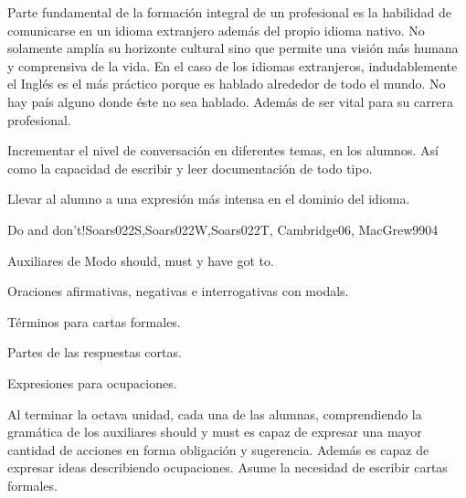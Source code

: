 \begin{syllabus}


\begin{justification}
Parte fundamental de la formación integral de un profesional es la habilidad 
de comunicarse en un idioma extranjero además del propio idioma nativo. 
No solamente amplía su horizonte cultural sino que permite una visión 
más humana y comprensiva de la vida. En el caso de los idiomas extranjeros, 
indudablemente el Inglés es el más práctico porque es hablado alrededor de 
todo el mundo. No hay país alguno donde éste no sea hablado. Además de ser 
vital para su carrera profesional.
\end{justification}

\begin{goals}
\item Incrementar el nivel de conversación en diferentes temas, en los alumnos. Así como la capacidad de escribir y leer documentación de todo tipo.
\item Llevar al alumno a una expresión más intensa en el dominio del idioma.
\end{goals}

\begin{outcomes}
\end{outcomes}

\begin{unit}{Do and don't!}{Soars022S,Soars022W,Soars022T, Cambridge06, MacGrew99}{0}{4}
   \begin{topics}
      \item Auxiliares de Modo should, must y have got to.
      \item Oraciones afirmativas, negativas e interrogativas con modals.
      \item Términos para cartas formales.
      \item Partes de las respuestas cortas.
      \item Expresiones para ocupaciones.
   \end{topics}

   \begin{unitgoals}
      \item Al terminar la octava unidad, cada una de las alumnas, comprendiendo la gramática de los auxiliares should y must  es capaz de expresar una mayor cantidad de acciones en forma obligación y sugerencia.  Además es capaz de expresar ideas describiendo ocupaciones.  Asume la necesidad de escribir cartas formales. 
   \end{unitgoals}
\end{unit}


\end{syllabus}
